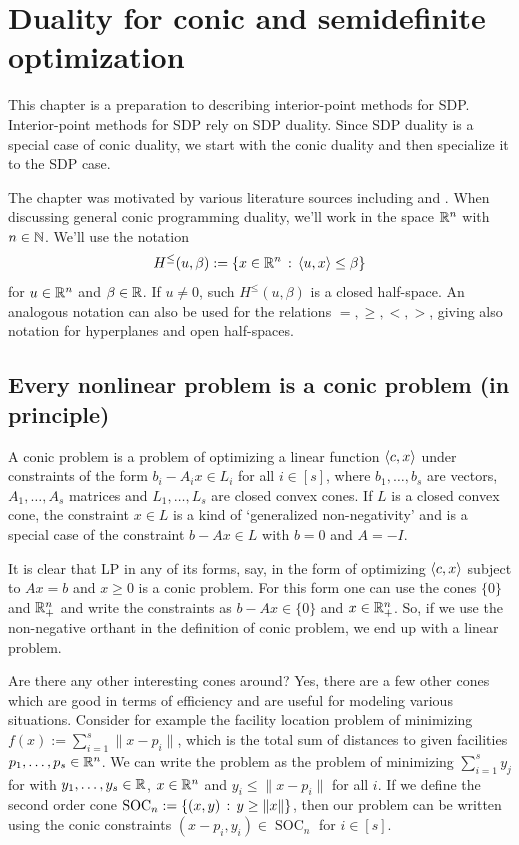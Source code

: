 
\section{Duality for conic and semidefinite optimization}

\label{conic:optimization}

This chapter is a preparation to describing interior-point methods for SDP. Interior-point methods for SDP rely on SDP duality. Since SDP duality is a special case of conic duality, we start with the conic duality and then specialize it to the SDP case.  

The chapter was motivated by various literature sources including \cite{Laurent:Vallentin:2012} and \cite[Chapter~4]{Gaertner:Matousek:2012}. When discussing general conic programming duality, we'll work in the space $\mathbb{R}^n$ with $n \in \mathbb{N}$. We'll use the notation 
\[
	H^\le(u,\beta) := \left\{  x \in \mathbb{R}^n \,:\,  \left\langle u , x \right\rangle \le \beta \right\}
\]
for $u \in \mathbb{R}^n$ and $\beta \in \mathbb{R}$. If $u \ne 0$, such $H^\le(u,\beta)$ is a closed half-space. An analogous notation can also be used for the relations $=,\ge,<,>$, giving also notation for hyperplanes and open half-spaces.

\subsection{Every nonlinear problem is a conic problem (in principle)}

\newcommand{\SOC}{\operatorname{SOC}}

A conic problem is a problem of optimizing a linear function $\left\langle c , x \right\rangle$ under constraints of the form $b_i - A_i x \in L_i$ for all $i \in [s]$, where $b_1,\ldots,b_s$ are vectors, $A_1,\ldots,A_s$ matrices and $L_1,\ldots,L_s$ are closed convex cones. If $L$ is a closed convex cone, the constraint $x \in L$ is a kind of `generalized non-negativity' and is a special case of the constraint $b - A x \in L$ with $b=0$ and $A = -I$. 

It is clear that LP in any of its forms, say, in the form of optimizing $\left\langle c , x \right\rangle$ subject to $A x = b$ and $x \ge 0$ is a conic problem. For this form one can use the cones $\{0\}$ and $\mathbb{R}_+^n$ and write the constraints as $b- A x \in \{0\}$ and $x \in \mathbb{R}_+^n$. So, if we use the non-negative orthant in the definition of conic problem, we end up with a linear problem. 

Are there any other interesting cones around? Yes, there are a few other cones which are good in terms of efficiency and are useful for modeling various situations. Consider for example the facility location problem of minimizing $f(x) := \sum_{i=1}^s \|x- p_i\|$, which is the total sum of distances to given facilities $p_1, \ldots,p_s \in \mathbb{R}^n$. We can write the problem as the problem of minimizing $\sum_{i=1}^s y_j$ for with $y_1,\ldots,y_s \in \mathbb{R}$, $x \in \mathbb{R}^n$ and $y_i \le \|x-p_i\|$ for all $i$. If we define the second order cone $\SOC_n:=\setcond{(x,y)}{y \ge \|x\|}$, then our problem can be written using the conic constraints $(x - p_i,y_i) \in \SOC_n$ for $i \in [s]$. 

